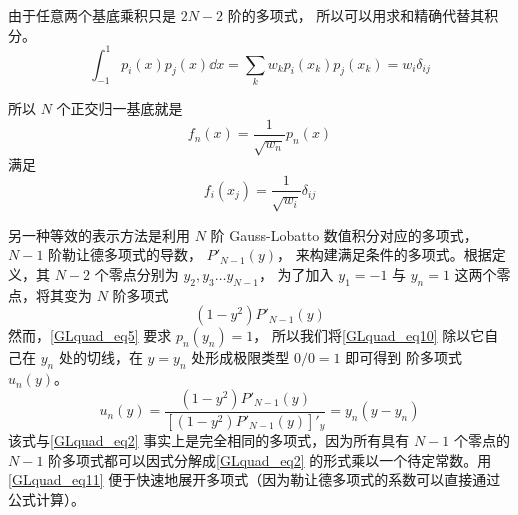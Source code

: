 由于任意两个基底乘积只是 $2N-2$ 阶的多项式， 所以可以用求和精确代替其积分。
\begin{equation}
\int_{-1}^1 p_i(x) p_j(x) \dd{x} = \sum_k w_k p_i(x_k) p_j(x_k) = w_i \delta_{ij}
\end{equation}

所以 $N$ 个正交归一基底就是
\begin{equation}\label{GLquad_eq3}
f_n(x) = \frac{1}{\sqrt{w_n}} p_n(x)
\end{equation}
满足
\begin{equation}
f_i(x_j) = \frac{1}{\sqrt{w_i}} \delta_{ij}
\end{equation}

另一种等效的表示方法是利用 $N$ 阶 Gauss-Lobatto 数值积分对应的多项式， $N-1$ 阶勒让德多项式的导数， $P'_{N-1}(y)$，  来构建满足条件的多项式。根据定义，其 $N-2$ 个零点分别为 $y_2, y_3\dots y_{N-1}$， 为了加入 $y_1=-1$ 与 $y_n=1$ 这两个零点，将其变为 $N$ 阶多项式
\begin{equation}\label{GLquad_eq10}
(1-y^2)P'_{N-1}(y)
\end{equation}
然而，\autoref{GLquad_eq5} 要求 $p_n(y_n)=1$， 所以我们将\autoref{GLquad_eq10} 除以它自己在 $y_n$ 处的切线，在 $y=y_n$ 处形成极限类型 $0/0=1$ 即可得到 阶多项式 $u_n(y)$。 
\begin{equation}\label{GLquad_eq11}
u_n(y) = \frac{(1-y^2)P'_{N-1}(y)}{[(1-y^2)P'_{N-1}(y)]'_y} = y_n (y-y_n)
\end{equation}
该式与\autoref{GLquad_eq2} 事实上是完全相同的多项式，因为所有具有 $N-1$ 个零点的 $N-1$ 阶多项式都可以因式分解成\autoref{GLquad_eq2} 的形式乘以一个待定常数。用\autoref{GLquad_eq11} 便于快速地展开多项式（因为勒让德多项式的系数可以直接通过公式计算）。
